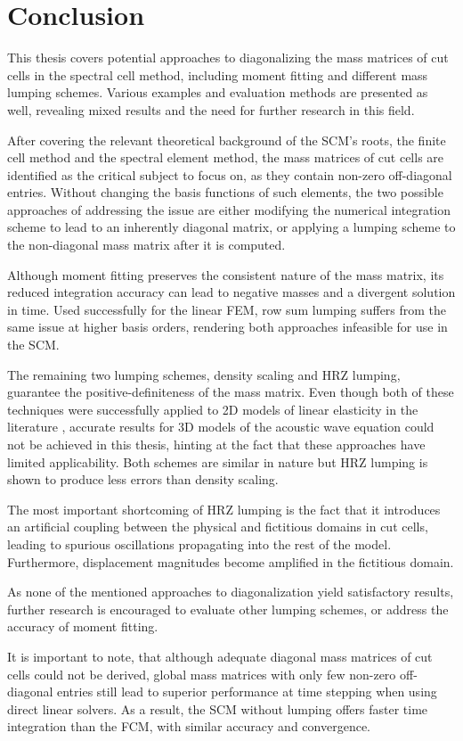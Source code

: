 %
\chapter{Conclusion}
\label{chapter:conclusion}
%

This thesis covers potential approaches to diagonalizing the mass matrices of cut cells in the spectral cell method, including moment fitting and different mass lumping schemes. Various examples and evaluation methods are presented as well, revealing mixed results and the need for further research in this field.

After covering the relevant theoretical background of the SCM's roots, the finite cell method and the spectral element method, the mass matrices of cut cells are identified as the critical subject to focus on, as they contain non-zero off-diagonal entries. Without changing the basis functions of such elements, the two possible approaches of addressing the issue are either modifying the numerical integration scheme to lead to an inherently diagonal matrix, or applying a lumping scheme to the non-diagonal mass matrix after it is computed.

Although moment fitting preserves the consistent nature of the mass matrix, its reduced integration accuracy can lead to negative masses and a divergent solution in time. Used successfully for the linear FEM, row sum lumping suffers from the same issue at higher basis orders, rendering both approaches infeasible for use in the SCM.

The remaining two lumping schemes, density scaling and HRZ lumping, guarantee the positive-definiteness of the mass matrix. Even though both of these techniques were successfully applied to 2D models of linear elasticity in the literature \cite{Joulaian2014}, accurate results for 3D models of the acoustic wave equation could not be achieved in this thesis, hinting at the fact that these approaches have limited applicability. Both schemes are similar in nature but HRZ lumping is shown to produce less errors than density scaling.

The most important shortcoming of HRZ lumping is the fact that it introduces an artificial coupling between the physical and fictitious domains in cut cells, leading to spurious oscillations propagating into the rest of the model. Furthermore, displacement magnitudes become amplified in the fictitious domain.

As none of the mentioned approaches to diagonalization yield satisfactory results, further research is encouraged to evaluate other lumping schemes, or address the accuracy of moment fitting.

It is important to note, that although adequate diagonal mass matrices of cut cells could not be derived, global mass matrices with only few non-zero off-diagonal entries still lead to superior performance at time stepping when using direct linear solvers. As a result, the SCM without lumping offers faster time integration than the FCM, with similar accuracy and convergence.